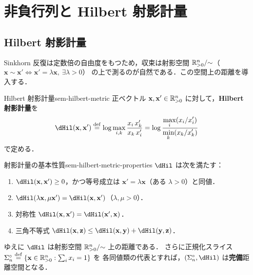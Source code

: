 \chapter{非負行列と Hilbert 射影計量}
\label{ch:found-nonneg-matrix}

\section{Hilbert 射影計量}
\label{sec:sem-hilbert-metric}

Sinkhorn 反復は定数倍の自由度をもつため，収束は射影空間
$\mathbb{R}_{>0}^n / {\sim}$（$\mathbf{x} \sim \mathbf{x}' \iff \mathbf{x}' = \lambda\mathbf{x},\ \exists\lambda>0$）
の上で測るのが自然である．この空間上の距離を導入する．

\begin{definition}{Hilbert 射影計量}{sem-hilbert-metric}
  正ベクトル $\mathbf{x}, \mathbf{x}' \in \mathbb{R}_{>0}^n$ に対して，\textbf{Hilbert 射影計量}を
  \[
    \dHil(\mathbf{x}, \mathbf{x}')
    \defeq
    \log \max_{i, k} \frac{x_i\, x'_k}{x_k\, x'_i}
    = \log \frac{\displaystyle\max_i (x_i / x'_i)}{\displaystyle\min_k (x_k / x'_k)}
  \]
  で定める．
\end{definition}

\begin{claim}{射影計量の基本性質}{sem-hilbert-metric-properties}
  $\dHil$ は次を満たす：
  \begin{enumerate}
    \item $\dHil(\mathbf{x}, \mathbf{x}') \geq 0$，かつ等号成立は $\mathbf{x}' = \lambda\mathbf{x}$（ある $\lambda>0$）と同値．
    \item $\dHil(\lambda\mathbf{x}, \mu\mathbf{x}') = \dHil(\mathbf{x}, \mathbf{x}')$（$\lambda, \mu > 0$）．
    \item 対称性 $\dHil(\mathbf{x}, \mathbf{x}') = \dHil(\mathbf{x}', \mathbf{x})$．
    \item 三角不等式 $\dHil(\mathbf{x}, \mathbf{z}) \leq \dHil(\mathbf{x}, \mathbf{y}) + \dHil(\mathbf{y}, \mathbf{z})$．
  \end{enumerate}
  ゆえに $\dHil$ は射影空間 $\mathbb{R}_{>0}^n / {\sim}$ 上の距離である．
  さらに正規化スライス $\Sigma_n^\circ \overset{\mathrm{def}}{=} \{\mathbf{x} \in \mathbb{R}_{>0}^n : \sum_i x_i = 1\}$ を
  各同値類の代表とすれば，$(\simplex_n^\circ, \dHil)$ は\textbf{完備}距離空間となる．
\end{claim}

